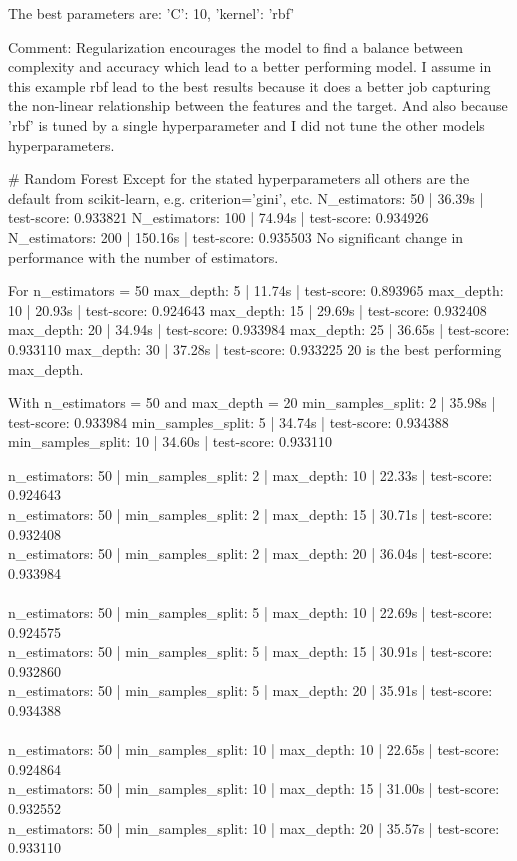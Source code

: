\documentclass[12pt, letterpaper]{article}
\begin{document}
The best parameters are: {'C': 10, 'kernel': 'rbf'}

Comment:
Regularization encourages the model to find a balance between complexity and accuracy which lead to a better performing model.
I assume in this example rbf lead to the best results because it does a better job capturing the non-linear relationship between the features and the target.
And also because 'rbf' is tuned by a single hyperparameter and I did not tune the other models hyperparameters.

# Random Forest
Except for the stated hyperparameters all others are the default from scikit-learn, e.g. criterion='gini', etc.
N_estimators: 50 | 36.39s | test-score: 0.933821
N_estimators: 100 | 74.94s | test-score: 0.934926
N_estimators: 200 | 150.16s | test-score: 0.935503
No significant change in performance with the number of estimators.

For n_estimators = 50
max_depth: 5 | 11.74s | test-score: 0.893965
max_depth: 10 | 20.93s | test-score: 0.924643
max_depth: 15 | 29.69s | test-score: 0.932408
max_depth: 20 | 34.94s | test-score: 0.933984
max_depth: 25 | 36.65s | test-score: 0.933110
max_depth: 30 | 37.28s | test-score: 0.933225
20 is the best performing max_depth.

With n_estimators = 50 and max_depth = 20
min_samples_split: 2 | 35.98s | test-score: 0.933984
min_samples_split: 5 | 34.74s | test-score: 0.934388
min_samples_split: 10 | 34.60s | test-score: 0.933110


n_estimators: 50 | min_samples_split: 2 | max_depth: 10 | 22.33s | test-score: 0.924643 \\
n_estimators: 50 | min_samples_split: 2 | max_depth: 15 | 30.71s | test-score: 0.932408 \\
n_estimators: 50 | min_samples_split: 2 | max_depth: 20 | 36.04s | test-score: 0.933984 \\ \\
n_estimators: 50 | min_samples_split: 5 | max_depth: 10 | 22.69s | test-score: 0.924575 \\
n_estimators: 50 | min_samples_split: 5 | max_depth: 15 | 30.91s | test-score: 0.932860 \\
n_estimators: 50 | min_samples_split: 5 | max_depth: 20 | 35.91s | test-score: 0.934388 \\ \\
n_estimators: 50 | min_samples_split: 10 | max_depth: 10 | 22.65s | test-score: 0.924864 \\
n_estimators: 50 | min_samples_split: 10 | max_depth: 15 | 31.00s | test-score: 0.932552 \\
n_estimators: 50 | min_samples_split: 10 | max_depth: 20 | 35.57s | test-score: 0.933110 \\ \\ \\
\end{document}
